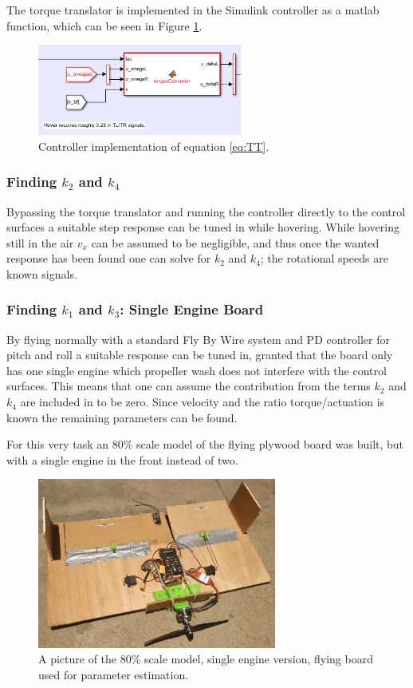 \documentclass{article}
\begin{document}
The torque translator is implemented in the Simulink controller as a matlab function, which can be seen in Figure \ref{fig:TT}.
\begin{figure}
    \center
    \includegraphics[width=0.6\textwidth]{TT.PNG}
    \caption{Controller implementation of equation \ref{eq:TT}.}
    \label{fig:TT}
\end{figure}

\subsubsection{Finding $k_2$ and $k_4$}
Bypassing the torque translator and running the controller directly to the control surfaces a suitable step response can be tuned in while hovering.
While hovering still in the air $v_x$ can be assumed to be negligible, and thus once the wanted response has been found one can solve for $k_2$ and $k_4$; the rotational speeds are known signals.

\subsubsection{Finding $k_1$ and $k_3$: Single Engine Board}
By flying normally with a standard Fly By Wire system and PD controller for pitch and roll a suitable response can be tuned in, granted that the board only has one single engine which propeller wash does not interfere with the control surfaces.
This means that one can assume the contribution from the terms $k_2$ and $k_4$ are included in to be zero.
Since velocity and the ratio torque/actuation is known the remaining parameters can be found.

For this very task an 80\% scale model of the flying plywood board was built, but with a single engine in the front instead of two.

\begin{figure}
    \center
    \includegraphics[width=0.7\textwidth]{singleengine.jpg}
    \caption{A picture of the 80\% scale model, single engine version, flying board used for parameter estimation.}
    \label{fig:singleengine}
\end{figure}
\end{document}
